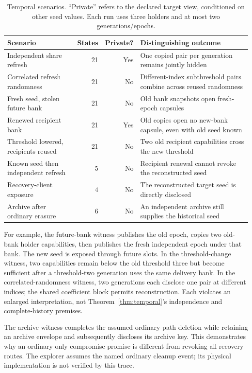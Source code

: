 \documentclass[pdflatex,sn-mathphys-num]{sn-jnl}
\theoremstyle{plain}
\theoremstyle{definition}
\begin{document}
\begin{table}[htbp]
\caption{Temporal scenarios. ``Private'' refers to the declared target view, conditioned on other seed values. Each run uses three holders and at most two generations/epochs.}\label{tab:temporal}
\centering\footnotesize
\begin{tabularx}{\linewidth}{@{}p{.43\linewidth}rrY@{}}\toprule
Scenario & States & Private? & Distinguishing outcome\\\midrule
Independent share refresh &21&Yes&One copied pair per generation remains jointly hidden\\
Correlated refresh randomness &21&No&Different-index subthreshold pairs combine across reused randomness\\
Fresh seed, stolen future bank &21&No&Old bank snapshots open fresh-epoch capsules\\
Renewed recipient bank &21&Yes&Old copies open no new-bank capsule, even with old seed known\\
Threshold lowered, recipients reused &21&No&Two old recipient capabilities cross the new threshold\\
Known seed then independent refresh &5&No&Recipient renewal cannot revoke the reconstructed seed\\
Recovery-client exposure &4&No&The reconstructed target seed is directly disclosed\\
Archive after ordinary erasure &6&No&An independent archive still supplies the historical seed\\\bottomrule
\end{tabularx}
\end{table}

For example, the future-bank witness publishes the old epoch, copies two old-bank holder capabilities, then publishes the fresh independent epoch under that bank. The new seed is exposed through future slots. In the threshold-change witness, two capabilities remain below the old threshold three but become sufficient after a threshold-two generation uses the same delivery bank. In the correlated-randomness witness, two generations each disclose one pair at different indices; the shared coefficient block permits reconstruction. Each violates an enlarged interpretation, not Theorem~\ref{thm:temporal}'s independence and complete-history premises.

The archive witness completes the assumed ordinary-path deletion while retaining an archive envelope and subsequently discloses its archive key. This demonstrates why an ordinary-only compromise promise is different from revoking all recovery routes. The explorer assumes the named ordinary cleanup event; its physical implementation is not verified by this trace.
\end{document}
